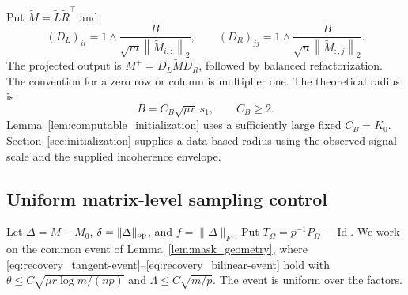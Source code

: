 \documentclass[numsec,webpdf,modern,large,namedate]{oup-authoring-template}
\theoremstyle{plain}
\theoremstyle{remark}
\providecommand{\norm}[1]{\left\|#1\right\|}
\newif\ifmarkchanges
\newenvironment{revision}{\begingroup\ifmarkchanges\color{red}\fi}{\endgroup}
\begin{document}
\begin{revision}
Put $\widetilde M=\widetilde L\widetilde R^\top$ and
\[
 (D_L)_{ii}=1\wedge\frac{B}{\sqrt m\norm{\widetilde M_{i,:}}_2},\qquad
 (D_R)_{jj}=1\wedge\frac{B}{\sqrt n\norm{\widetilde M_{:,j}}_2}.
\]
The projected output is $M^+=D_L\widetilde M D_R$, followed by balanced
refactorization.  The convention for a zero row or column is multiplier one.
The theoretical radius is
\begin{equation}
 B=C_B\sqrt{\mu r}\,s_1,\qquad C_B\ge2.\label{eq:recovery_radius}
\end{equation}
Lemma~\ref{lem:computable_initialization} uses a sufficiently large fixed
$C_B=K_0$.  Section~\ref{sec:initialization} supplies a data-based radius
using the observed signal scale and the supplied incoherence envelope.

\subsection{Uniform matrix-level sampling control}
Let $\Delta=M-M_0$, $\delta=\|\Delta\|_{\rm op}$, and
$f=\|\Delta\|_F$.  Put $T_\Omega=p^{-1}P_\Omega-\operatorname{Id}$.
We work on the common event of Lemma~\ref{lem:mask_geometry}, where
\eqref{eq:recovery_tangent-event}--\eqref{eq:recovery_bilinear-event} hold with
$\theta\le C\sqrt{\mu r\log m/(np)}$ and
$\Lambda\le C\sqrt{m/p}$.  The event is uniform over the factors.


\end{revision}
\end{document}
